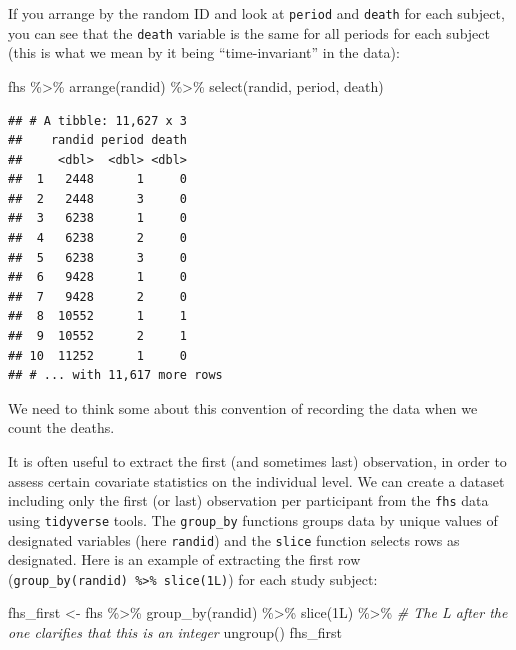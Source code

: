 \documentclass[
]{book}
\newenvironment{Shaded}{\begin{snugshade}}{\end{snugshade}}
\newcommand{\CommentTok}[1]{\textcolor[rgb]{0.56,0.35,0.01}{\textit{#1}}}
\newcommand{\FunctionTok}[1]{\textcolor[rgb]{0.00,0.00,0.00}{#1}}
\newcommand{\NormalTok}[1]{#1}
\newcommand{\OtherTok}[1]{\textcolor[rgb]{0.56,0.35,0.01}{#1}}
\newcommand{\SpecialCharTok}[1]{\textcolor[rgb]{0.00,0.00,0.00}{#1}}
\begin{document}
If you arrange by the random ID and look at \texttt{period} and \texttt{death} for each subject,
you can see that the \texttt{death} variable is the same for all periods for each
subject (this is what we mean by it being ``time-invariant'' in the data):

\begin{Shaded}
\begin{Highlighting}[]
\NormalTok{fhs }\SpecialCharTok{\%\textgreater{}\%} 
  \FunctionTok{arrange}\NormalTok{(randid) }\SpecialCharTok{\%\textgreater{}\%} 
  \FunctionTok{select}\NormalTok{(randid, period, death)}
\end{Highlighting}
\end{Shaded}

\begin{verbatim}
## # A tibble: 11,627 x 3
##    randid period death
##     <dbl>  <dbl> <dbl>
##  1   2448      1     0
##  2   2448      3     0
##  3   6238      1     0
##  4   6238      2     0
##  5   6238      3     0
##  6   9428      1     0
##  7   9428      2     0
##  8  10552      1     1
##  9  10552      2     1
## 10  11252      1     0
## # ... with 11,617 more rows
\end{verbatim}

We need to think some about this convention of recording the data when we count
the deaths.

It is often useful to extract the first (and sometimes last) observation, in order to assess certain covariate statistics on the individual level. We can create a dataset including only the first (or last) observation per participant from the \texttt{fhs} data using \texttt{tidyverse} tools. The \texttt{group\_by} functions groups data by unique values of designated variables (here \texttt{randid}) and the \texttt{slice} function selects rows as designated. Here is an example of extracting the first row (\texttt{group\_by(randid)\ \%\textgreater{}\%\ slice(1L)}) for each study subject:

\begin{Shaded}
\begin{Highlighting}[]
\NormalTok{fhs\_first }\OtherTok{\textless{}{-}}\NormalTok{ fhs }\SpecialCharTok{\%\textgreater{}\%} 
  \FunctionTok{group\_by}\NormalTok{(randid) }\SpecialCharTok{\%\textgreater{}\%} 
  \FunctionTok{slice}\NormalTok{(1L) }\SpecialCharTok{\%\textgreater{}\%} \CommentTok{\# The L after the one clarifies that this is an integer}
  \FunctionTok{ungroup}\NormalTok{()}
\NormalTok{fhs\_first}
\end{Highlighting}
\end{Shaded}
\end{document}
